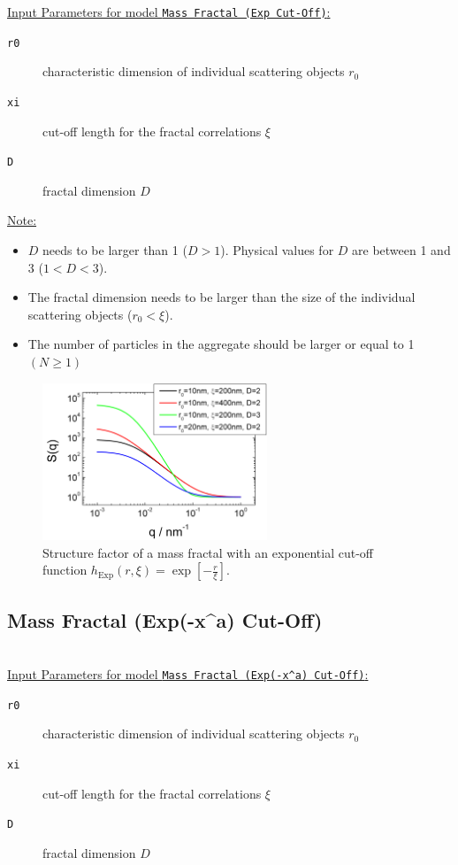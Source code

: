\uline{Input Parameters for model \texttt{Mass Fractal (Exp Cut-Off)}:}
\begin{description}
\item[\texttt{r0}] characteristic dimension of individual scattering objects $r_0$
\item[\texttt{xi}] cut-off length for the fractal correlations $\xi$
\item[\texttt{D}] fractal dimension $D$
\end{description}

\uline{Note:}
\begin{itemize}
\item $D$ needs to be larger than 1 ($D>1$). Physical values for $D$ are between 1 and 3 ($1<D<3$).
\item The fractal dimension needs to be larger than the size of the individual scattering objects ($r_0 < \xi$).
\item The number of particles in the aggregate should be larger or equal to 1 $(N\geq 1)$
\end{itemize}

\begin{figure}[htb]
\begin{center}
\includegraphics[width=0.6\textwidth]{../images/structure_factor/MassFractals/SQExpCutOff.png}
\end{center}
\caption{Structure factor of a mass fractal with an exponential
cut-off function $h_\text{Exp}(r,\xi) = \exp\left[-\tfrac{r}{\xi}\right]$.}
\label{fig:SQExpCutOff}
\end{figure}


\clearpage
\subsection{Mass Fractal (Exp(-x\^{}a) Cut-Off)}
~\\

\uline{Input Parameters for model \texttt{Mass Fractal (Exp(-x\^{}a) Cut-Off)}:}
\begin{description}
\item[\texttt{r0}] characteristic dimension of individual scattering objects $r_0$
\item[\texttt{xi}] cut-off length for the fractal correlations $\xi$
\item[\texttt{D}] fractal dimension $D$
\end{description}

